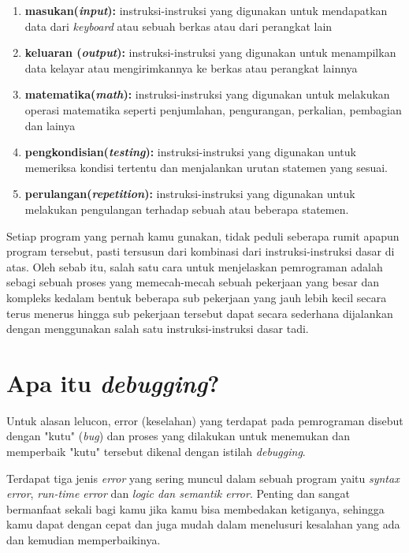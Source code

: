 \begin{enumerate}
	\item \textbf{masukan(\textit{input}):} instruksi-instruksi yang digunakan untuk mendapatkan data dari \textit{keyboard} atau sebuah berkas atau dari perangkat lain
	\item \textbf{keluaran (\textit{output}):} instruksi-instruksi yang digunakan untuk menampilkan data kelayar atau mengirimkannya ke berkas atau perangkat lainnya
	\item \textbf{matematika(\textit{math}): }instruksi-instruksi yang digunakan untuk melakukan operasi matematika seperti penjumlahan, pengurangan, perkalian, pembagian dan lainya
	\item \textbf{pengkondisian(\textit{testing}):} instruksi-instruksi yang digunakan untuk memeriksa kondisi tertentu dan menjalankan urutan statemen yang sesuai.
	\item \textbf{perulangan(\textit{repetition}):} instruksi-instruksi yang digunakan untuk melakukan pengulangan terhadap sebuah atau beberapa statemen.
\end{enumerate}

Setiap program yang pernah kamu gunakan, tidak peduli seberapa rumit apapun program tersebut, pasti tersusun dari kombinasi dari instruksi-instruksi dasar di atas. Oleh sebab itu, salah satu cara untuk menjelaskan pemrograman adalah sebagi sebuah proses yang memecah-mecah sebuah pekerjaan yang besar dan kompleks kedalam bentuk beberapa sub pekerjaan yang jauh lebih kecil secara terus menerus hingga sub pekerjaan tersebut dapat secara sederhana dijalankan dengan menggunakan salah satu instruksi-instruksi dasar tadi.

\section{Apa itu \textit{debugging}?}

Untuk alasan lelucon, error (keselahan) yang terdapat pada pemrograman disebut dengan "kutu" (\textit{bug}) dan proses yang dilakukan untuk menemukan dan memperbaik "kutu" tersebut dikenal dengan istilah \textit{debugging}.

Terdapat tiga jenis \textit{error} yang sering muncul dalam sebuah program yaitu \textit{syntax error}, \textit{run-time error} dan \textit{logic dan semantik error}. Penting dan sangat bermanfaat sekali bagi kamu jika kamu bisa membedakan ketiganya,  sehingga kamu dapat dengan cepat dan juga mudah dalam menelusuri kesalahan yang ada dan kemudian memperbaikinya.

